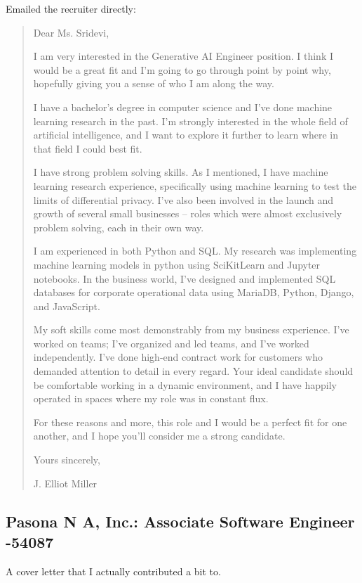 \documentclass[
	letterpaper, %
	12pt, %
]{CSSullivanBusinessReport}
\begin{document}
Emailed the recruiter directly: 

\begin{quote}
	Dear Ms. Sridevi,

	I am very interested in the Generative AI Engineer position. I think I would be a great fit and I'm going to go through point by point why, hopefully giving you a sense of who I am along the way.

	I have a bachelor's degree in computer science and I've done machine learning research in the past. I'm strongly interested in the whole field of artificial intelligence, and I want to explore it further to learn where in that field I could best fit.

	I have strong problem solving skills. As I mentioned, I have machine learning research experience, specifically using machine learning to test the limits of differential privacy. I've also been involved in the launch and growth of several small businesses -- roles which were almost exclusively problem solving, each in their own way.

	I am experienced in both Python and SQL. My research was implementing machine learning models in python using SciKitLearn and Jupyter notebooks. In the business world, I've designed and implemented SQL databases for corporate operational data using MariaDB, Python, Django, and JavaScript.

	My soft skills come most demonstrably from my business experience. I've worked on teams; I've organized and led teams, and I've worked independently. I've done high-end contract work for customers who demanded attention to detail in every regard. Your ideal candidate should be comfortable working in a dynamic environment, and I have happily operated in spaces where my role was in constant flux.

	For these reasons and more, this role and I would be a perfect fit for one another, and I hope you'll consider me a strong candidate.

	Yours sincerely,


	J. Elliot Miller

\end{quote}


\subsection[Pasona]{Pasona N A, Inc.: Associate Software Engineer -54087}

A cover letter that I actually contributed a bit to.
\end{document}
